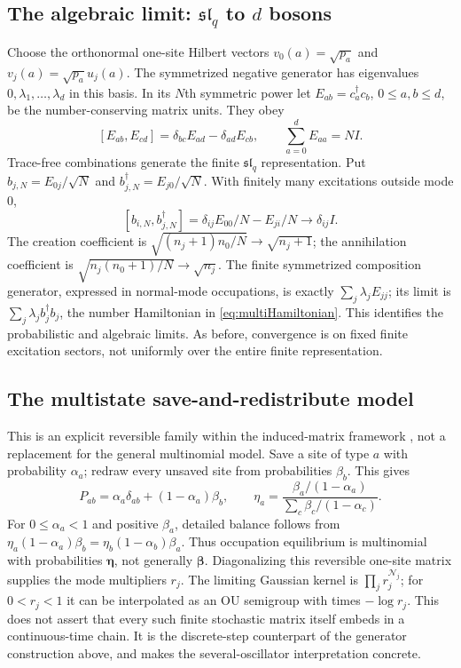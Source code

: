 \documentclass[11pt,reqno]{amsart}
\theoremstyle{definition}
\theoremstyle{remark}
\newcommand{\NN}{\mathcal N}
\newcommand{\Id}{I}
\begin{document}
\subsection{The algebraic limit: $\mathfrak{sl}_q$ to $d$ bosons}
Choose the orthonormal one-site Hilbert vectors
$v_0(a)=\sqrt{p_a}$ and $v_j(a)=\sqrt{p_a}u_j(a)$.
The symmetrized negative generator has eigenvalues
$0,\lambda_1,\ldots,\lambda_d$ in this basis. In its $N$th symmetric
power let $E_{ab}=c_a^\dagger c_b$, $0\le a,b\le d$, be the
number-conserving matrix units. They obey
\[
[E_{ab},E_{cd}]=\delta_{bc}E_{ad}-\delta_{ad}E_{cb},\qquad
\sum_{a=0}^dE_{aa}=N\Id.
\]
Trace-free combinations generate the finite $\mathfrak{sl}_q$
representation. Put
$b_{j,N}=E_{0j}/\sqrt N$ and $b_{j,N}^\dagger=E_{j0}/\sqrt N$.
With finitely many excitations outside mode $0$,
\begin{equation}\label{eq:multicontraction}
[b_{i,N},b_{j,N}^\dagger]=\delta_{ij}E_{00}/N-E_{ji}/N
\longrightarrow\delta_{ij}\Id.
\end{equation}
The creation coefficient is $\sqrt{(n_j+1)n_0/N}\to\sqrt{n_j+1}$;
the annihilation coefficient is $\sqrt{n_j(n_0+1)/N}\to\sqrt{n_j}$.
The finite symmetrized composition generator, expressed in normal-mode
occupations, is exactly $\sum_j\lambda_jE_{jj}$; its limit is
$\sum_j\lambda_jb_j^\dagger b_j$, the number Hamiltonian in
\eqref{eq:multiHamiltonian}. This identifies the probabilistic and
algebraic limits. As before, convergence is on fixed finite excitation
sectors, not uniformly over the entire finite representation.

\subsection{The multistate save-and-redistribute model}
This is an explicit reversible family within the induced-matrix
framework \cite{FeinsilverSFAII2023}, not a replacement for the general
multinomial model. Save a
site of type $a$ with probability $\alpha_a$; redraw every unsaved site
from probabilities $\beta_b$. This gives
\[
P_{ab}=\alpha_a\delta_{ab}+(1-\alpha_a)\beta_b,\qquad
\eta_a=\frac{\beta_a/(1-\alpha_a)}{\sum_c\beta_c/(1-\alpha_c)}.
\]
For $0\le\alpha_a<1$ and positive $\beta_a$, detailed balance follows
from $\eta_a(1-\alpha_a)\beta_b=\eta_b(1-\alpha_b)\beta_a$.
Thus occupation equilibrium is multinomial with probabilities
$\boldsymbol\eta$, not generally $\boldsymbol\beta$.
Diagonalizing this reversible one-site matrix supplies the mode
multipliers $r_j$. The limiting Gaussian kernel is
$\prod_jr_j^{\NN_j}$; for $0<r_j<1$ it can be interpolated as an OU
semigroup with times $-\log r_j$. This does not assert that every such
finite stochastic matrix itself embeds in a continuous-time chain.
It is the discrete-step counterpart of the generator construction
above, and makes the several-oscillator interpretation concrete.
\end{document}
